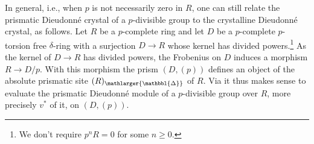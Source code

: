 \documentclass{amsart}
\newcommand{\prism}{{\mathlarger{\mathbbl{\Delta}}}}
\theoremstyle{plain}
\newtheorem{corollary}[theorem]{Corollary}
\theoremstyle{definition}
\newcommand{\crys}{\mathrm{crys}}
\newcommand{\Spec}{\mathrm{Spec}}
\newcommand{\Z}{\mathbb{Z}}
\begin{document}




In general, i.e., when $p$ is not necessarily zero in $R$, one can still relate the prismatic Dieudonn\'e crystal of a $p$-divisible group to the crystalline Dieudonn\'e crystal, as follows. Let $R$ be a $p$-complete ring and let $D$ be a $p$-complete $p$-torsion free $\delta$-ring with a surjection $D\to R$ whose kernel has divided powers.\footnote{We don't require $p^nR=0$ for some $n\geq 0$.}
As the kernel of $D\to R$ has divided powers, the Frobenius on $D$ induces a morphism $R\to D/p$. With this morphism the prism $(D,(p))$ defines an object of the absolute prismatic site $(R)_\prism$ of $R$. Via  it thus makes sense to evaluate the prismatic Dieudonn\'e module of a $p$-divisible group over $R$, more precisely $v^{\ast}$ of it, on $(D,(p))$.
\end{document}
